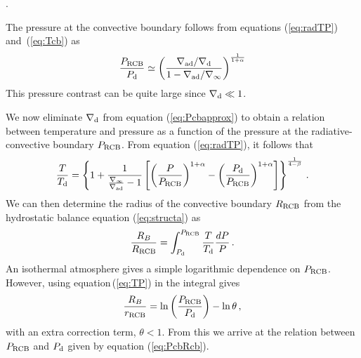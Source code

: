 \documentclass[apj]{emulateapj}
\newcommand{\delad}{\nabla_{\rm ad}}
\newcommand{\Eq}[1]{equation\,(\ref{#1})}
\newcommand{\Eqs}[2]{equations (\ref{#1}) and~(\ref{#2})}
\newcommand{\App}[1]{Appendix~\ref{#1}}
\newcommand{\di}{_{\rm d}}
\newcommand{\cb}{_{\rm RCB}}
\begin{document}
 . %


The pressure at the convective boundary  follows from \Eqs{eq:radTP}{eq:Tcb} as
\begin{equation}
\label{eq:Pcbapprox}
{P\cb\over P_{\rm d}} \simeq \left({\delad/\nabla\di \over 1 - \delad/\nabla_\infty}\right)^{1 \over 1 + \alpha}
\end{equation} 
This pressure contrast can be quite large since $\nabla_{\rm d} \ll 1$.
 
 We now eliminate $\nabla\di$ from equation (\ref{eq:Pcbapprox}) to obtain a relation between temperature and pressure as a function of the pressure at the radiative-convective boundary $P\cb$. From equation (\ref{eq:radTP}), it follows that
 \begin{equation}\label{eq:TP}
{T \over T_{\rm d}} = \left\{1 + {1 \over {\nabla_\infty \over \delad} - 1} \left[ \left({P \over P\cb}\right)^{1+\alpha} -  \left({P_{\rm d} \over P\cb}\right)^{1+\alpha}  \right] \right\}^{1 \over 4-\beta}\, .
\end{equation} 
 We can then determine the radius of the convective boundary $R\cb$ from the hydrostatic balance equation (\ref{eq:structa}) as 
\begin{equation}\label{eq:RCBint}
{R_B \over R\cb} = \int_{P\di}^{P\cb} {T \over T_{\rm d}} {dP \over P}\, .
\end{equation} 
An isothermal atmosphere gives a simple logarithmic dependence on $P\cb$.  However, using \Eq{eq:TP} in the integral gives
\begin{equation}\label{eq:Rcb}
{R_B \over r\cb} = \ln \left(P\cb \over P\di \right) - \ln \theta \, ,
\end{equation} 
with an extra correction term, $\theta < 1$.  From this we arrive at the relation between $P\cb$ and $P\di$ given by equation (\ref{eq:PcbRcb}).
\end{document}
